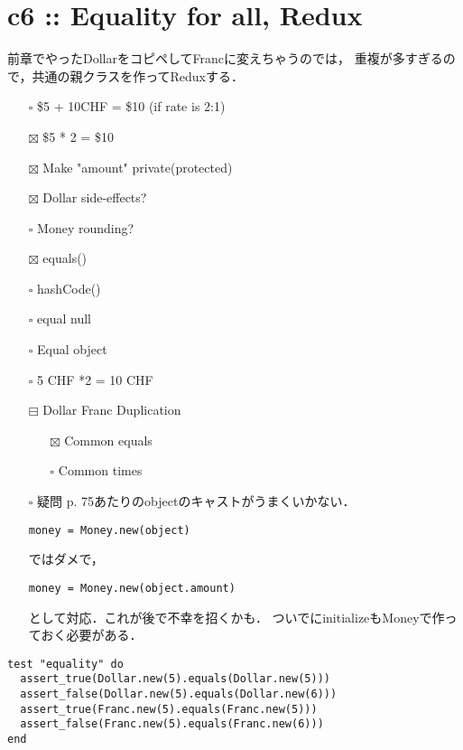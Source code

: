 \documentclass[11pt]{article}
\begin{document}
\section{c6 :: Equality for all, Redux}
\label{sec:orgb984f11}
前章でやったDollarをコピペしてFrancに変えちゃうのでは，
重複が多すぎるので，共通の親クラスを作ってReduxする．
\begin{itemize}
\item[{$\square$}] \$5 + 10CHF = \$10 (if rate is 2:1)
\item[{$\boxtimes$}] \$5 * 2 = \$10
\item[{$\boxtimes$}] Make "amount" private(protected)
\item[{$\boxtimes$}] Dollar side-effects?
\item[{$\square$}] Money rounding?
\item[{$\boxtimes$}] equals()
\item[{$\square$}] hashCode()
\item[{$\square$}] equal null
\item[{$\square$}] Equal object
\item[{$\square$}] 5 CHF *2 = 10 CHF
\item[{$\boxminus$}] Dollar Franc Duplication
\begin{itemize}
\item[{$\boxtimes$}] Common equals
\item[{$\square$}] Common times
\end{itemize}

\item[{$\square$}] 疑問
p. 75あたりのobjectのキャストがうまくいかない．
\begin{verbatim}
money = Money.new(object)
\end{verbatim}

ではダメで，
\begin{verbatim}
money = Money.new(object.amount)
\end{verbatim}

として対応．これが後で不幸を招くかも．
ついでにinitializeもMoneyで作っておく必要がある．
\end{itemize}

\begin{verbatim}
test "equality" do
  assert_true(Dollar.new(5).equals(Dollar.new(5)))
  assert_false(Dollar.new(5).equals(Dollar.new(6)))
  assert_true(Franc.new(5).equals(Franc.new(5)))
  assert_false(Franc.new(5).equals(Franc.new(6)))
end
\end{verbatim}
\end{document}
